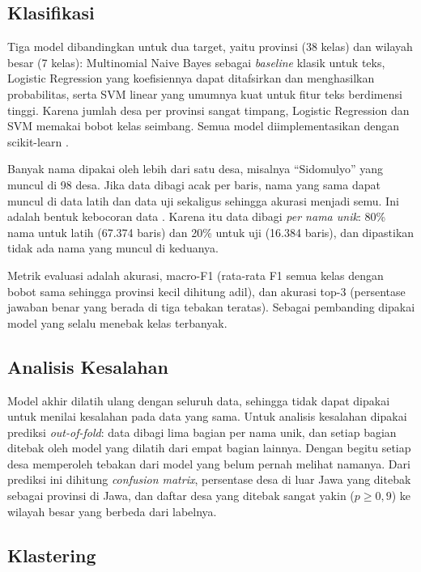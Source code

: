 \documentclass[conference]{IEEEtran}
\begin{document}
\subsection{Klasifikasi}

Tiga model dibandingkan untuk dua target, yaitu provinsi (38 kelas) dan wilayah besar (7 kelas): Multinomial Naive Bayes \cite{mccallum1998} sebagai \textit{baseline} klasik untuk teks, Logistic Regression yang koefisiennya dapat ditafsirkan dan menghasilkan probabilitas, serta SVM linear \cite{cortes1995,fan2008} yang umumnya kuat untuk fitur teks berdimensi tinggi. Karena jumlah desa per provinsi sangat timpang, Logistic Regression dan SVM memakai bobot kelas seimbang. Semua model diimplementasikan dengan scikit-learn \cite{pedregosa2011}.

Banyak nama dipakai oleh lebih dari satu desa, misalnya ``Sidomulyo'' yang muncul di 98 desa. Jika data dibagi acak per baris, nama yang sama dapat muncul di data latih dan data uji sekaligus sehingga akurasi menjadi semu. Ini adalah bentuk kebocoran data \cite{kaufman2012}. Karena itu data dibagi \textit{per nama unik}: 80\% nama untuk latih (67.374 baris) dan 20\% untuk uji (16.384 baris), dan dipastikan tidak ada nama yang muncul di keduanya.

Metrik evaluasi adalah akurasi, macro-F1 (rata-rata F1 semua kelas dengan bobot sama sehingga provinsi kecil dihitung adil), dan akurasi top-3 (persentase jawaban benar yang berada di tiga tebakan teratas). Sebagai pembanding dipakai model yang selalu menebak kelas terbanyak.

\subsection{Analisis Kesalahan}

Model akhir dilatih ulang dengan seluruh data, sehingga tidak dapat dipakai untuk menilai kesalahan pada data yang sama. Untuk analisis kesalahan dipakai prediksi \textit{out-of-fold}: data dibagi lima bagian per nama unik, dan setiap bagian ditebak oleh model yang dilatih dari empat bagian lainnya. Dengan begitu setiap desa memperoleh tebakan dari model yang belum pernah melihat namanya. Dari prediksi ini dihitung \textit{confusion matrix}, persentase desa di luar Jawa yang ditebak sebagai provinsi di Jawa, dan daftar desa yang ditebak sangat yakin ($p \geq 0{,}9$) ke wilayah besar yang berbeda dari labelnya.

\subsection{Klastering}
\end{document}
